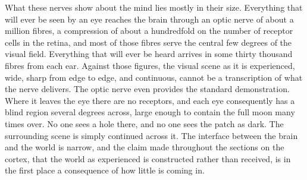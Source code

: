 \documentclass[11pt]{article}
\begin{document}
What these nerves show about the mind lies mostly in their size. Everything that will ever be seen by an eye reaches the brain through an optic nerve of about a million fibres, a compression of about a hundredfold on the number of receptor cells in the retina, and most of those fibres serve the central few degrees of the visual field. Everything that will ever be heard arrives in some thirty thousand fibres from each ear. Against those figures, the visual scene as it is experienced, wide, sharp from edge to edge, and continuous, cannot be a transcription of what the nerve delivers. The optic nerve even provides the standard demonstration. Where it leaves the eye there are no receptors, and each eye consequently has a blind region several degrees across, large enough to contain the full moon many times over. No one sees a hole there, and no one sees the patch as dark. The surrounding scene is simply continued across it. The interface between the brain and the world is narrow, and the claim made throughout the sections on the cortex, that the world as experienced is constructed rather than received, is in the first place a consequence of how little is coming in.
\end{document}
